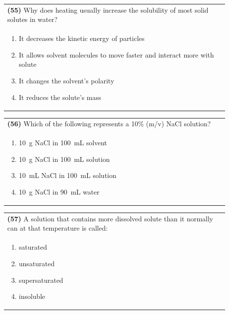 \documentclass{article}
\begin{document}
\noindent\begin{tabular}{|p{0.9\linewidth}|}
\hline
\textbf{(55)} Why does heating usually increase the solubility of most solid solutes in water?\\[0.2cm]
\begin{minipage}[t]{0.85\linewidth}
\begin{enumerate}[label=\alph*.]
\item It decreases the kinetic energy of particles
\item It allows solvent molecules to move faster and interact more with solute
\item It changes the solvent's polarity
\item It reduces the solute's mass
\end{enumerate}
\end{minipage}\\[0.2cm]
\hline
\end{tabular}

\noindent\begin{tabular}{|p{0.9\linewidth}|}
\hline
\textbf{(56)} Which of the following represents a 10\% (m/v) NaCl solution?\\[0.2cm]
\begin{minipage}[t]{0.85\linewidth}
\begin{enumerate}[label=\alph*.]
\item 10~g NaCl in 100~mL solvent
\item 10~g NaCl in 100~mL solution
\item 10~mL NaCl in 100~mL solution
\item 10~g NaCl in 90~mL water
\end{enumerate}
\end{minipage}\\[0.2cm]
\hline
\end{tabular}
\newpage

\noindent\begin{tabular}{|p{0.9\linewidth}|}
\hline
\textbf{(57)} A solution that contains more dissolved solute than it normally can at that temperature is called:\\[0.2cm]
\begin{minipage}[t]{0.85\linewidth}
\begin{enumerate}[label=\alph*.]
\item saturated
\item unsaturated
\item supersaturated
\item insoluble
\end{enumerate}
\end{minipage}\\[0.2cm]
\hline
\end{tabular}
\end{document}
